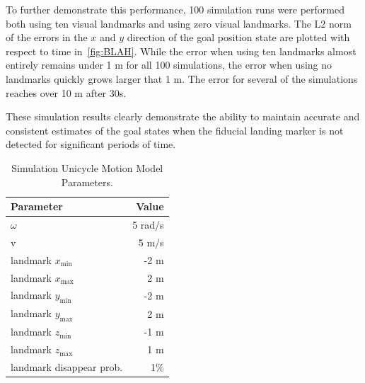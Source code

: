 To further demonstrate this performance, 100 simulation runs were performed
both using ten visual landmarks and using zero visual landmarks. The L2 norm of
the errors in the $x$ and $y$ direction of the goal position state are plotted
with respect to time in~\ref{fig:BLAH}. While the error when using ten landmarks
almost entirely remains under 1 m for all 100 simulations, the error when using
no landmarks quickly grows larger that 1 m. The error for several of the
simulations reaches over 10 m after 30s.

These simulation results clearly demonstrate the ability to maintain accurate
and consistent estimates of the goal states when the fiducial landing marker is
not detected for significant periods of time.


\begin{table}[h!]
  \begin{center}
    \caption{Simulation Unicycle Motion Model Parameters.}
    \label{tab:sim_unicycle}
    \begin{tabular}{l|r}
      \textbf{Parameter} & \textbf{Value} \\
      \hline
      $\omega$ & 5 rad/s \\
      v & 5 m/s \\
      landmark $x_{\text{min}}$ & -2 m \\
      landmark $x_{\text{max}}$ & 2 m \\
      landmark $y_{\text{min}}$ & -2 m \\
      landmark $y_{\text{max}}$ & 2 m \\
      landmark $z_{\text{min}}$ & -1 m \\
      landmark $z_{\text{max}}$ & 1 m \\
      landmark disappear prob. & 1\% \\
    \end{tabular}
  \end{center}
\end{table}

